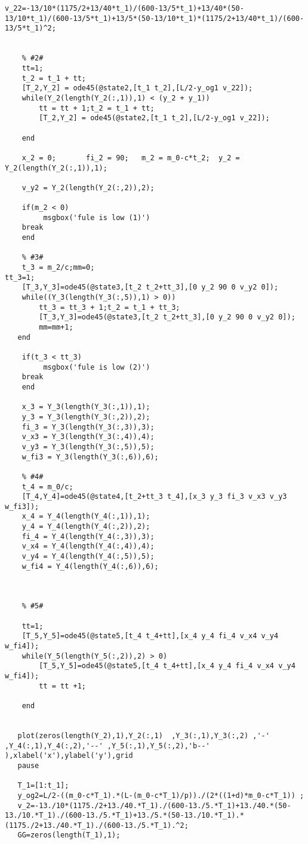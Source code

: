 \documentclass[UTF8]{article}
\begin{document}
\begin{appendix}
\begin{lstlisting}[title=main.m, frame=shadowbox]
   v_22=-13/10*(1175/2+13/40*t_1)/(600-13/5*t_1)+13/40*(50-13/10*t_1)/(600-13/5*t_1)+13/5*(50-13/10*t_1)*(1175/2+13/40*t_1)/(600-13/5*t_1)^2;
   
    
    % #2#
    tt=1;
    t_2 = t_1 + tt;
    [T_2,Y_2] = ode45(@state2,[t_1 t_2],[L/2-y_og1 v_22]);
    while(Y_2(length(Y_2(:,1)),1) < (y_2 + y_1))
        tt = tt + 1;t_2 = t_1 + tt;
        [T_2,Y_2] = ode45(@state2,[t_1 t_2],[L/2-y_og1 v_22]);
        
    end
    
    x_2 = 0;       fi_2 = 90;   m_2 = m_0-c*t_2;  y_2 = Y_2(length(Y_2(:,1)),1);
    
    v_y2 = Y_2(length(Y_2(:,2)),2);
  
    if(m_2 < 0)
         msgbox('fule is low (1)')
    break
    end

    % #3#
    t_3 = m_2/c;mm=0;
tt_3=1;
    [T_3,Y_3]=ode45(@state3,[t_2 t_2+tt_3],[0 y_2 90 0 v_y2 0]);
    while((Y_3(length(Y_3(:,5)),1) > 0))
        tt_3 = tt_3 + 1;t_2 = t_1 + tt_3;
        [T_3,Y_3]=ode45(@state3,[t_2 t_2+tt_3],[0 y_2 90 0 v_y2 0]);
        mm=mm+1;
   end
    
    if(t_3 < tt_3)
         msgbox('fule is low (2)')
    break
    end
       
    x_3 = Y_3(length(Y_3(:,1)),1);
    y_3 = Y_3(length(Y_3(:,2)),2);
    fi_3 = Y_3(length(Y_3(:,3)),3);
    v_x3 = Y_3(length(Y_3(:,4)),4);
    v_y3 = Y_3(length(Y_3(:,5)),5);
    w_fi3 = Y_3(length(Y_3(:,6)),6);

    % #4#
    t_4 = m_0/c;
    [T_4,Y_4]=ode45(@state4,[t_2+tt_3 t_4],[x_3 y_3 fi_3 v_x3 v_y3 w_fi3]);
    x_4 = Y_4(length(Y_4(:,1)),1);
    y_4 = Y_4(length(Y_4(:,2)),2);
    fi_4 = Y_4(length(Y_4(:,3)),3);
    v_x4 = Y_4(length(Y_4(:,4)),4);
    v_y4 = Y_4(length(Y_4(:,5)),5);
    w_fi4 = Y_4(length(Y_4(:,6)),6);

    
    
    % #5#

    tt=1;
    [T_5,Y_5]=ode45(@state5,[t_4 t_4+tt],[x_4 y_4 fi_4 v_x4 v_y4 w_fi4]);
    while(Y_5(length(Y_5(:,2)),2) > 0)
        [T_5,Y_5]=ode45(@state5,[t_4 t_4+tt],[x_4 y_4 fi_4 v_x4 v_y4 w_fi4]);
        tt = tt +1;
        
    end
 

   plot(zeros(length(Y_2),1),Y_2(:,1)  ,Y_3(:,1),Y_3(:,2) ,'-' ,Y_4(:,1),Y_4(:,2),'--' ,Y_5(:,1),Y_5(:,2),'b--' ),xlabel('x'),ylabel('y'),grid
   pause
   
   T_1=[1:t_1];
   y_og2=L/2-((m_0-c*T_1).*(L-(m_0-c*T_1)/p))./(2*((1+d)*m_0-c*T_1)) ;
   v_2=-13./10*(1175./2+13./40.*T_1)./(600-13./5.*T_1)+13./40.*(50-13./10.*T_1)./(600-13./5.*T_1)+13./5.*(50-13./10.*T_1).*(1175./2+13./40.*T_1)./(600-13./5.*T_1).^2;
   GG=zeros(length(T_1),1);
   

\end{lstlisting}
\end{appendix}
\end{document}
